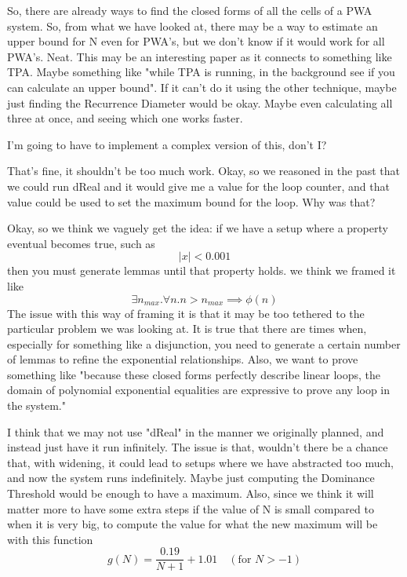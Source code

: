 So, there are already ways to find the closed forms of all the cells of a PWA system. So, from what we have looked at, there may be a way to estimate an upper bound for N even for PWA's, but we don't know if it would work for all PWA's. Neat. This may be an interesting paper as it connects to something like TPA. Maybe something like "while TPA is running, in the background see if you can calculate an upper bound". If it can't do it using the other technique, maybe just finding the Recurrence Diameter would be okay. Maybe even calculating all three at once, and seeing which one works faster.

I'm going to have to implement a complex version of this, don't I?

That's fine, it shouldn't be too much work. Okay, so we reasoned in the past that we could run dReal and it would give me a value for the loop counter, and that value could be used to set the maximum bound for the loop. Why was that?

Okay, so we think we vaguely get the idea: if we have a setup where a property eventual becomes true, such as
\begin{equation*}
    |x| < 0.001
\end{equation*}
then you must generate lemmas until that property holds. we think we framed it like
\begin{equation*}
    \exists n_{max} .\forall n . n > n_{max} \implies \phi(n)
\end{equation*}
The issue with this way of framing it is that it may be too tethered to the particular problem we was looking at. It is true that there are times when, especially for something like a disjunction, you need to generate a certain number of lemmas to refine the exponential relationships. Also, we want to prove something like "because these closed forms perfectly describe linear loops, the domain of polynomial exponential equalities are expressive to prove any loop in the system."

I think that we may not use "dReal" in the manner we originally planned, and instead just have it run infinitely. The issue is that, wouldn't there be a chance that, with widening, it could lead to setups where we have abstracted too much, and now the system runs indefinitely. Maybe just computing the Dominance Threshold would be enough to have a maximum. Also, since we think it will matter more to have some extra steps if the value of N is small compared to when it is very big, to compute the value for what the new maximum will be with this function
\begin{equation*}
    g(N) = \frac{0.19}{N + 1} + 1.01 \quad (\text{for } N > -1)
\end{equation*}


